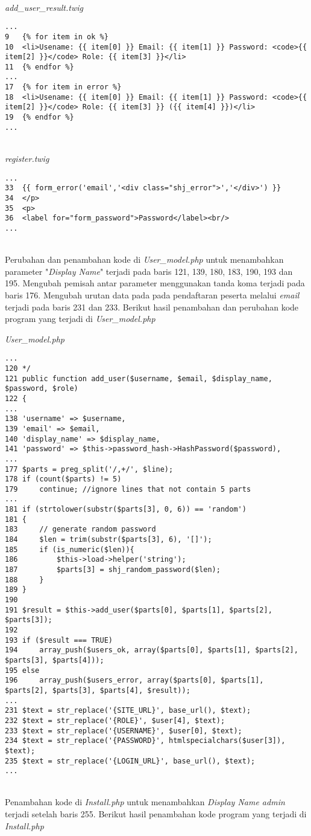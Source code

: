 ~\\
\textit{add\_user\_result.twig}
\begin{lstlisting}[basicstyle=\ttfamily, frame=single,
columns=fullflexible, keepspaces=true, breaklines=true]
...
9	{% for item in ok %}
10	<li>Usename: {{ item[0] }} Email: {{ item[1] }} Password: <code>{{ item[2] }}</code> Role: {{ item[3] }}</li>
11	{% endfor %}
...
17	{% for item in error %}
18	<li>Usename: {{ item[0] }} Email: {{ item[1] }} Password: <code>{{ item[2] }}</code> Role: {{ item[3] }} ({{ item[4] }})</li>
19	{% endfor %}
...
\end{lstlisting}
~\\
\textit{register.twig}
\begin{lstlisting}[basicstyle=\ttfamily, frame=single,
columns=fullflexible, keepspaces=true, breaklines=true]
...
33	{{ form_error('email','<div class="shj_error">','</div>') }}
34	</p>
35	<p>
36	<label for="form_password">Password</label><br/>
...
\end{lstlisting}
~\\
Perubahan dan penambahan kode di \textit{User\_model.php} untuk menambahkan parameter "\textit{Display Name}" terjadi pada baris 121, 139, 180, 183, 190, 193 dan 195. Mengubah pemisah antar parameter menggunakan tanda koma terjadi pada baris 176. Mengubah urutan data pada pada pendaftaran peserta melalui \textit{email} terjadi pada baris 231 dan 233. Berikut hasil penambahan dan perubahan kode program yang terjadi di \textit{User\_model.php}

\textit{User\_model.php}
\begin{lstlisting}[basicstyle=\ttfamily, frame=single,
columns=fullflexible, keepspaces=true, breaklines=true]
...
120	*/
121	public function add_user($username, $email, $display_name, $password, $role)
122	{
...
138	'username' => $username,
139	'email' => $email,
140	'display_name' => $display_name,
141	'password' => $this->password_hash->HashPassword($password),
...
177	$parts = preg_split('/,+/', $line);
178	if (count($parts) != 5)
179		continue; //ignore lines that not contain 5 parts
...
181	if (strtolower(substr($parts[3], 0, 6)) == 'random')
181	{
183		// generate random password
184		$len = trim(substr($parts[3], 6), '[]');
185		if (is_numeric($len)){
186			$this->load->helper('string');
187			$parts[3] = shj_random_password($len);
188		}
189	}
190	
191	$result = $this->add_user($parts[0], $parts[1], $parts[2], $parts[3]);
192	
193	if ($result === TRUE)
194		array_push($users_ok, array($parts[0], $parts[1], $parts[2], $parts[3], $parts[4]));
195	else
196		array_push($users_error, array($parts[0], $parts[1], $parts[2], $parts[3], $parts[4], $result));
...
231	$text = str_replace('{SITE_URL}', base_url(), $text);
232	$text = str_replace('{ROLE}', $user[4], $text);
233	$text = str_replace('{USERNAME}', $user[0], $text);
234	$text = str_replace('{PASSWORD}', htmlspecialchars($user[3]), $text);
235	$text = str_replace('{LOGIN_URL}', base_url(), $text);
...
\end{lstlisting}
~\\
Penambahan kode di \textit{Install.php} untuk menambahkan \textit{Display Name admin} terjadi setelah baris 255. Berikut hasil penambahan kode program yang terjadi di \textit{Install.php}
 
